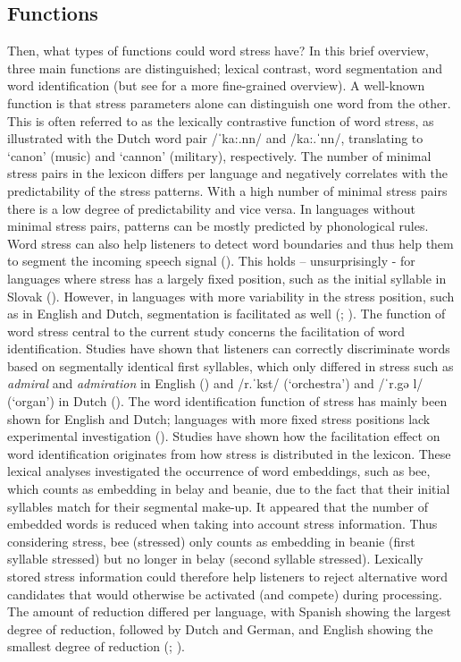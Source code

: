 \subsection{Functions} \label{sec513}
Then, what types of functions could word stress have? In this brief overview, three main functions are distinguished; lexical contrast, word segmentation and word identification (but see \citealt{cutler_lexical_2005} for a more fine-grained overview). A well-known function is that stress parameters alone can distinguish one word from the other. This is often referred to as the lexically contrastive function of word stress, as illustrated with the Dutch word pair /ˈka:.nn/ and /ka:.ˈnn/, translating to `canon' (music) and `cannon' (military), respectively. The number of minimal stress pairs in the lexicon differs per language and negatively correlates with the predictability of the stress patterns. With a high number of minimal stress pairs there is a low degree of predictability and vice versa. In languages without minimal stress pairs, patterns can be mostly predicted by phonological rules. Word stress can also help listeners to detect word boundaries and thus help them to segment the incoming speech signal (\citealt{cutler_native_2012}). This holds – unsurprisingly - for languages where stress has a largely fixed position, such as the initial syllable in Slovak (\citealt{hanulikova_possible_2010}). However, in languages with more variability in the stress position, such as in English and Dutch, segmentation is facilitated as well (\citealt{cutler_rhythmic_1992}; \citealt{vroomen_cues_1996}). The function of word stress central to the current study concerns the facilitation of word identification. Studies have shown that listeners can correctly discriminate words based on segmentally identical first syllables, which only differed in stress such as \textit{admiral} and \textit{admiration} in English (\citealt{cooper_constraints_2002}) and /r.ˈkst/ (`orchestra') and /ˈr.gə l/ (`organ') in Dutch (\citealt{vanheuven_effects_1988}). The word identification function of stress has mainly been shown for English and Dutch; languages with more fixed stress positions lack experimental investigation (\citealt{cutler_lexical_2005}). Studies have shown how the facilitation effect on word identification originates from how stress is distributed in the lexicon. These lexical analyses investigated the occurrence of word embeddings, such as bee, which counts as embedding in belay and beanie, due to the fact that their initial syllables match for their segmental make-up. It appeared that the number of embedded words is reduced when taking into account stress information. Thus considering stress, bee (stressed) only counts as embedding in beanie (first syllable stressed) but no longer in belay (second syllable stressed). Lexically stored stress information could therefore help listeners to reject alternative word candidates that would otherwise be activated (and compete) during processing. The amount of reduction differed per language, with Spanish showing the largest degree of reduction, followed by Dutch and German, and English showing the smallest degree of reduction (\citealt{cutler_phonemic_2004}; \citealt{cutler_explaining_2006}).

